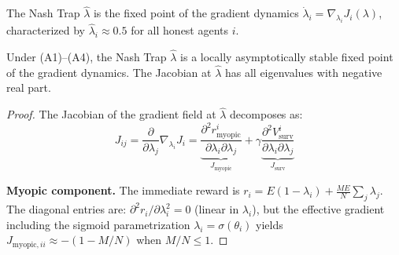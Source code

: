 \begin{definition}
The Nash Trap $\hat{\lambda}$ is the fixed point of the
gradient dynamics
$\dot{\lambda}_i = \nabla_{\lambda_i} J_i(\lambda)$,
characterized by $\hat{\lambda}_i \approx 0.5$ for all honest
agents $i$.
\end{definition}

\begin{lemma}
\label{lem:basin}
Under (A1)--(A4), the Nash Trap $\hat{\lambda}$ is a locally
asymptotically stable fixed point of the gradient dynamics.
The Jacobian at $\hat{\lambda}$ has all eigenvalues with negative
real part.
\end{lemma}

\begin{proof}
The Jacobian of the gradient field at $\hat{\lambda}$ decomposes as:
\[
  J_{ij} = \frac{\partial}{\partial \lambda_j}
            \nabla_{\lambda_i} J_i
          = \underbrace{\frac{\partial^2 r_{\mathrm{myopic}}^i}
            {\partial \lambda_i \partial \lambda_j}}_{J_{\mathrm{myopic}}}
          + \gamma \underbrace{\frac{\partial^2
            V_{\mathrm{surv}}^i}{\partial \lambda_i
            \partial \lambda_j}}_{J_{\mathrm{surv}}}
\]

\textbf{Myopic component.}
The immediate reward is
$r_i = E(1-\lambda_i) + \frac{ME}{N}\sum_j \lambda_j$.
The diagonal entries are:
$\partial^2 r_i / \partial \lambda_i^2 = 0$
(linear in $\lambda_i$), but the effective gradient including
the sigmoid parametrization $\lambda_i = \sigma(\theta_i)$
yields $J_{\mathrm{myopic},ii} \approx -(1 - M/N)$ when $M/N \leq 1$.


\end{proof}
